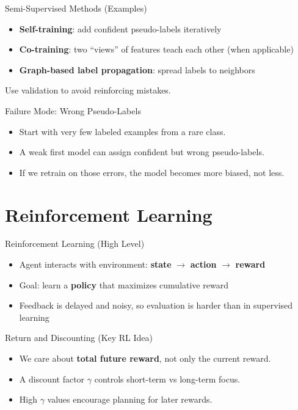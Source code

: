 \documentclass[aspectratio=169]{beamer}
\begin{document}
\begin{frame}{Semi-Supervised Methods (Examples)}
  \begin{itemize}[<+->]
    \item \textbf{Self-training}: add confident pseudo-labels iteratively
    \item \textbf{Co-training}: two ``views'' of features teach each other (when applicable)
    \item \textbf{Graph-based label propagation}: spread labels to neighbors
  \end{itemize}
  \vspace{0.3em}
  \small Use validation to avoid reinforcing mistakes.
\end{frame}

\begin{frame}{Failure Mode: Wrong Pseudo-Labels}
  \begin{itemize}[<+->]
    \item Start with very few labeled examples from a rare class.
    \item A weak first model can assign confident but wrong pseudo-labels.
    \item If we retrain on those errors, the model becomes more biased, not less.
  \end{itemize}
\end{frame}

\section{Reinforcement Learning}
\label{sec:rl}

\begin{frame}{Reinforcement Learning (High Level)}
  \begin{itemize}[<+->]
    \item Agent interacts with environment: \textbf{state} $\rightarrow$ \textbf{action} $\rightarrow$ \textbf{reward}
    \item Goal: learn a \textbf{policy} that maximizes cumulative reward
    \item Feedback is delayed and noisy, so evaluation is harder than in supervised learning
  \end{itemize}
\end{frame}

\begin{frame}{Return and Discounting (Key RL Idea)}
  \begin{itemize}[<+->]
    \item We care about \textbf{total future reward}, not only the current reward.
    \item A discount factor $\gamma$ controls short-term vs long-term focus.
    \item High $\gamma$ values encourage planning for later rewards.
  \end{itemize}
\end{frame}
\end{document}
